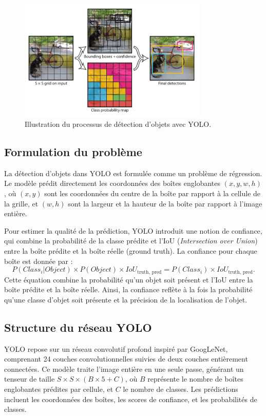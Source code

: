 \documentclass[a4paper,11pt]{article}
\begin{document}
\begin{figure}[h!]
    \centering
    \includegraphics[width=0.8\textwidth]{../Images/yolo_architecture.PNG}
    \caption{Illustration du processus de détection d'objets avec YOLO.}
    \label{fig:yolo}
\end{figure}
    

\subsection{Formulation du problème}

\indent La détection d'objets dans YOLO est formulée comme un problème de régression. Le modèle prédit directement les coordonnées des boîtes englobantes $(x, y, w, h)$, où $(x, y)$ sont les coordonnées du centre de la boîte par rapport à la cellule de la grille, et $(w, h)$ sont la largeur et la hauteur de la boîte par rapport à l'image entière.

Pour estimer la qualité de la prédiction, YOLO introduit une notion de confiance, qui combine la probabilité de la classe prédite et l'IoU (\textit{Intersection over Union}) entre la boîte prédite et la boîte réelle (ground truth). La confiance pour chaque boîte est donnée par :
\[
P(Class_i|Object) \times P(Object) \times IoU_{\text{truth, pred}} = P(Class_i) \times IoU_{\text{truth, pred}}.
\]
\indent Cette équation combine la probabilité qu’un objet soit présent et l’IoU entre la boîte prédite et la boîte réelle. Ainsi, la confiance reflète à la fois la probabilité qu’une classe d’objet soit présente et la précision de la localisation de l’objet.

\subsection{Structure du réseau YOLO}

\indent YOLO repose sur un réseau convolutif profond inspiré par GoogLeNet, comprenant 24 couches convolutionnelles suivies de deux couches entièrement connectées. Ce modèle traite l'image entière en une seule passe, générant un tenseur de taille $S \times S \times (B \times 5 + C)$, où $B$ représente le nombre de boîtes englobantes prédites par cellule, et $C$ le nombre de classes. Les prédictions incluent les coordonnées des boîtes, les scores de confiance, et les probabilités de classes.
\end{document}
